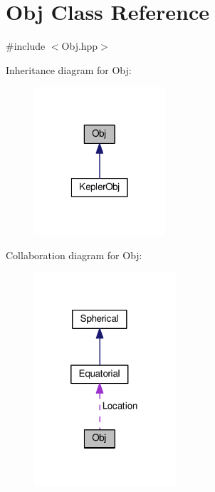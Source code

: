 \hypertarget{class_obj}{\section{Obj Class Reference}
\label{class_obj}
}


{\ttfamily \#include $<$Obj.\-hpp$>$}



Inheritance diagram for Obj\-:\nopagebreak
\begin{figure}[H]
\begin{center}
\leavevmode
\includegraphics[width=138pt]{class_obj__inherit__graph}
\end{center}
\end{figure}


Collaboration diagram for Obj\-:\nopagebreak
\begin{figure}[H]
\begin{center}
\leavevmode
\includegraphics[width=149pt]{class_obj__coll__graph}
\end{center}
\end{figure}
